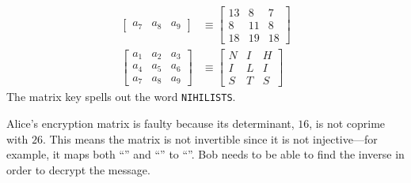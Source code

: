 \begin{Answer}
\begin{align*}
\begin{bmatrix}
  a_7 & a_8 & a_9
\end{bmatrix} &\equiv \begin{bmatrix}
  13 &  8 &  7\\
   8 & 11 &  8\\
  18 & 19 & 18 
\end{bmatrix}\\
\begin{bmatrix}
  a_1 & a_2 & a_3 \\
  a_4 & a_5 & a_6 \\
  a_7 & a_8 & a_9
\end{bmatrix} &\equiv \begin{bmatrix}
   N & I & H\\
   I & L & I\\
   S & T & S 
\end{bmatrix}
\end{align*}
The matrix key spells out the word \verb#NIHILISTS#.
\newline

\noindent
Alice's encryption matrix is faulty because its determinant, $16$, is not coprime with $26$.
This means the matrix is not invertible since it is not injective---for
example, it maps both ``'' and ``'' to ``''. Bob needs to be able to
find the inverse in order to decrypt the message.

\end{Answer}
